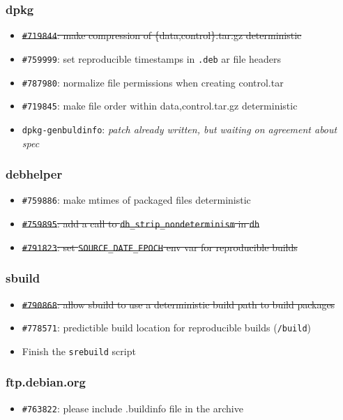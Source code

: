 \documentclass[14pt,aspectratio=169]{beamer}
\begin{document}
\begin{frame}
 \frametitle{dpkg}

 \begin{itemize}\small
  \item \sout{\texttt{\#719844}: make compression of \{data,control\}.tar.gz deterministic}
  \item \texttt{\#759999}: set reproducible timestamps in \texttt{.deb} ar file headers
  \item \texttt{\#787980}: normalize file permissions when creating control.tar
  \item \texttt{\#719845}: make file order within {data,control}.tar.gz deterministic
  \item \texttt{dpkg-genbuldinfo}: \textit{patch already written, but waiting on agreement about spec}
 \end{itemize}
\end{frame}

\begin{frame}
 \frametitle{debhelper}

 \begin{itemize}\small
  \item \texttt{\#759886}: make mtimes of packaged files deterministic
  \item \sout{\texttt{\#759895}: add a call to
  \texttt{dh\_strip\_nondeterminism} in \texttt{dh}}
  \item \sout{\texttt{\#791823}: set \texttt{SOURCE\_DATE\_EPOCH} env var for
  reproducible builds}
 \end{itemize}
\end{frame}

\begin{frame}
 \frametitle{sbuild}

 \begin{itemize}\small
  \item \sout{\texttt{\#790868}: allow sbuild to use a deterministic build
  path to build packages}
  \item \texttt{\#778571}: predictible build location for reproducible builds
  (\texttt{/build})
  \item Finish the \texttt{srebuild} script
 \end{itemize}
\end{frame}

\begin{frame}
 \frametitle{ftp.debian.org}

 \begin{itemize}\small
  \item \texttt{\#763822}: please include .buildinfo file in the archive
 \end{itemize}
\end{frame}
\end{document}
